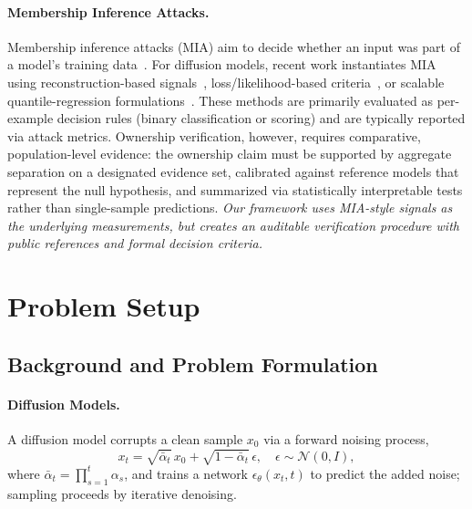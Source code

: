 \documentclass{article}
\begin{document}
\paragraph{Membership Inference Attacks.}
Membership inference attacks (MIA) aim to decide whether an input was part of a model's training data~\citep{shokri2017membership,yeom2018privacy,salem2019ml}.
For diffusion models, recent work instantiates MIA using reconstruction-based signals~\citep{carlini2023extracting,duan2023diffusion,kong2024efficient}, loss/likelihood-based criteria~\citep{matsumoto2023membership,hu2023loss}, or scalable quantile-regression formulations~\citep{bertran2023scalable,tang2024membership}.
These methods are primarily evaluated as per-example decision rules (binary classification or scoring) and are typically reported via attack metrics.
Ownership verification, however, requires comparative, population-level evidence: the ownership claim must be supported by aggregate separation on a designated evidence set, calibrated against reference models that represent the null hypothesis, and summarized via statistically interpretable tests rather than single-sample predictions.
\textit{Our framework uses MIA-style signals as the underlying measurements, but creates an auditable verification procedure with public references and formal decision criteria.}



\section{Problem Setup}
\label{sec:problem}

\subsection{Background and Problem Formulation}

\paragraph{Diffusion Models.}
A diffusion model corrupts a clean sample $x_0$ via a forward 
noising process,
\begin{equation}
    x_t = \sqrt{\bar\alpha_t}\, x_0 
        + \sqrt{1-\bar\alpha_t}\,\epsilon, 
    \quad \epsilon \sim \mathcal{N}(0, I),
\end{equation}
where $\bar\alpha_t = \prod_{s=1}^{t}\alpha_s$, and trains a 
network $\epsilon_\theta(x_t, t)$ to predict the added noise; 
sampling proceeds by iterative denoising.
\end{document}
